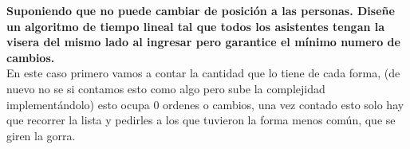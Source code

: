 \textbf{Suponiendo que no puede cambiar de posición a las personas. Diseñe un algoritmo de tiempo lineal tal que todos los asistentes tengan la visera del mismo lado al ingresar pero garantice el mínimo numero de cambios.}\\

En este caso primero vamos a contar la cantidad que lo tiene de cada forma, (de nuevo no se si contamos esto como algo pero sube la complejidad implementándolo) esto ocupa 0 ordenes o cambios, una vez contado esto solo hay que recorrer la lista y pedirles a los que tuvieron la forma menos común, que se giren la gorra.